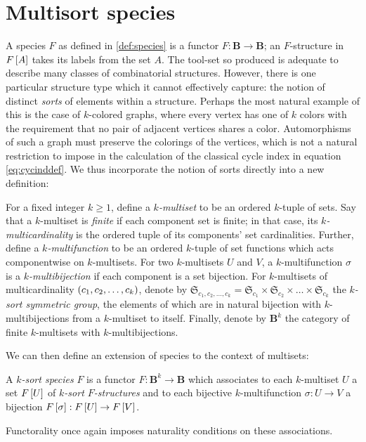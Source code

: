 \documentclass[sectionflow,singlespace,twoside]{brandiss} %
\numberwithin{section}{chapter}
\numberwithin{figure}{chapter}
\begin{document}
\section{Multisort species}\label{s:mult}
A species $F$ as defined in \ref{def:species} is a functor $F: \mathbf{B} \to \mathbf{B}$; an $F$-structure in $F \left[ {A} \right]$ takes its labels from the set $A$.
The tool-set so produced is adequate to describe many classes of combinatorial structures.
However, there is one particular structure type which it cannot effectively capture: the notion of distinct \emph{sorts} of elements within a structure.
Perhaps the most natural example of this is the case of $k$-colored graphs, where every vertex has one of $k$ colors with the requirement that no pair of adjacent vertices shares a color.
Automorphisms of such a graph must preserve the colorings of the vertices, which is not a natural restriction to impose in the calculation of the classical cycle index in equation \eqref{eq:cycinddef}.
We thus incorporate the notion of sorts directly into a new definition:
\begin{definition} 
  \label{def:multiset}
  For a fixed integer $k \geq 1$, define a \emph{$k$-multiset} to be an ordered $k$-tuple of sets.
  Say that a $k$-multiset is \emph{finite} if each component set is finite; in that case, its \emph{$k$-multicardinality} is the ordered tuple of its components' set cardinalities.
  Further, define a \emph{$k$-multifunction} to be an ordered $k$-tuple of set functions which acts componentwise on $k$-multisets.
  For two $k$-multisets $U$ and $V$, a $k$-multifunction $\sigma$ is a \emph{$k$-multibijection} if each component is a set bijection.
  For $k$-multisets of multicardinality $\left( {c_{1}, c_{2}, \dots, c_{k}} \right)$, denote by $\mathfrak{S}_{c_{1}, c_{2}, \dots, c_{k}} = \mathfrak{S}_{c_{1}} \times \mathfrak{S}_{c_{2}} \times \dots \times \mathfrak{S}_{c_{k}}$ the \emph{$k$-sort symmetric group}, the elements of which are in natural bijection with $k$-multibijections from a $k$-multiset to itself.
  Finally, denote by $\mathbf{B}^{k}$ the category of finite $k$-multisets with $k$-multibijections.
\end{definition}

We can then define an extension of species to the context of multisets:
\begin{definition}
  \label{def:multisort}
  A \emph{$k$-sort species} $F$ is a functor $F: \mathbf{B}^{k} \to \mathbf{B}$ which associates to each $k$-multiset $U$ a set $F \left[ {U} \right]$ of \emph{$k$-sort $F$-structures} and to each bijective $k$-multifunction $\sigma: U \to V$ a bijection $F \left[ {\sigma} \right]: F \left[ {U} \right] \to F \left[ {V} \right]$.
\end{definition}
Functorality once again imposes naturality conditions on these associations.
\end{document}
